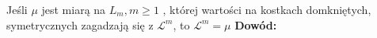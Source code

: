 \begin{lem}
    Jeśli $\mu$ jest miarą na $L_m, m \geq 1$ , której wartości na kostkach domkniętych, symetrycznych zagadzają się z $\mathcal{L}^m$, to $\mathcal{L}^m = \mu$
    \newline
    \textbf{Dowód:} \citep[4.35]{Tworzewski}
\end{lem}